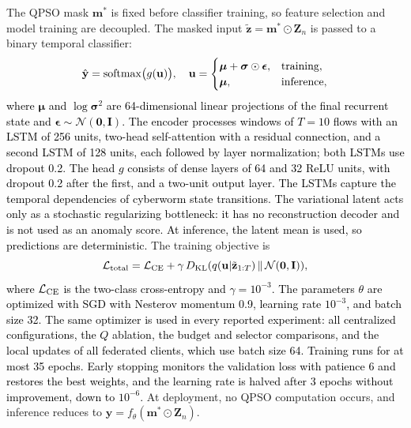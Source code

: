 \documentclass[conference]{IEEEtran}
\begin{document}
The QPSO mask $\mathbf{m}^{*}$ is fixed before classifier training,
so feature selection and model training are decoupled. The masked
input $\tilde{\mathbf{z}}=\mathbf{m}^{*}\odot\mathbf{Z}_n$ is passed
to a binary temporal classifier:
\begin{equation}
\hat{\mathbf{y}} = \mathrm{softmax}\bigl(g(\mathbf{u})\bigr),\quad
\mathbf{u} = \textcolor{black}{\begin{cases}
\boldsymbol{\mu}+\boldsymbol{\sigma}\odot\boldsymbol{\epsilon}, & \text{training},\\
\boldsymbol{\mu}, & \text{inference},
\end{cases}}
\label{eq:classifier}
\end{equation}
\textcolor{black}{where $\boldsymbol{\mu}$ and
$\log\boldsymbol{\sigma}^2$ are 64-dimensional linear projections of
the final recurrent state and
$\boldsymbol{\epsilon}\sim\mathcal{N}(\mathbf{0},\mathbf{I})$. The
encoder processes windows of $T=10$ flows with an LSTM of 256 units,
two-head self-attention with a residual connection, and a second LSTM
of 128 units, each followed by layer normalization; both LSTMs use
dropout 0.2. The head $g$ consists of dense layers of 64 and 32 ReLU
units, with dropout 0.2 after the first, and a two-unit output layer.
The LSTMs capture the temporal dependencies of cyberworm state
transitions. The variational latent acts only as a stochastic
regularizing bottleneck: it has no reconstruction decoder and is not
used as an anomaly score. At inference, the latent mean is used, so
predictions are deterministic.} The training objective is
\begin{equation}
\mathcal{L}_{\rm total} = \textcolor{black}{\mathcal{L}_{\rm CE}
+ \gamma\,D_{\rm KL}\!\left(q(\mathbf{u}|\tilde{\mathbf{z}}_{1:T})\,\|\,
\mathcal{N}(\mathbf{0},\mathbf{I})\right)},
\label{eq:total_loss}
\end{equation}
\textcolor{black}{where $\mathcal{L}_{\rm CE}$ is the
two-class cross-entropy and $\gamma=10^{-3}$.}
\textcolor{black}{The parameters $\theta$ are optimized with
SGD with Nesterov momentum 0.9, learning rate $10^{-3}$, and batch
size 32. The same optimizer is used in every reported experiment:
all centralized configurations, the $Q$ ablation, the budget and
selector comparisons, and the local updates of all federated clients,
which use batch size 64.} \textcolor{black}{Training runs
for at most 35 epochs. Early stopping monitors the validation loss
with patience 6 and restores the best weights, and the learning rate
is halved after 3 epochs without improvement, down to $10^{-6}$.}
At deployment, no QPSO computation occurs, and inference reduces to
$\hat{\mathbf{y}}=f_\theta(\mathbf{m}^{*}\odot\mathbf{Z}_n)$.
\end{document}
